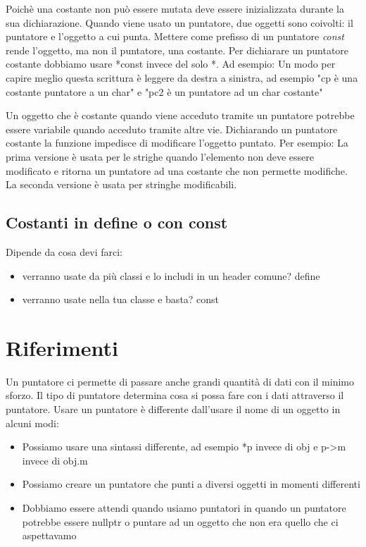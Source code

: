 \documentclass[11pt,a4paper]{book}
\begin{document}
Poichè una costante non può essere mutata deve essere inizializzata durante la sua dichiarazione.
\label{code: 094}
Quando viene usato un puntatore, due oggetti sono coivolti: il puntatore e l'oggetto a cui punta. Mettere come prefisso di un puntatore \emph{const} rende l'oggetto, ma non il puntatore, una costante. Per dichiarare un puntatore costante dobbiamo usare *const invece del solo *. Ad esempio:
\label{code: 093}
Un modo per capire meglio questa scrittura è leggere da destra a sinistra, ad esempio "cp è una costante puntatore a un char" e "pc2 è un puntatore ad un char costante"

Un oggetto che è costante quando viene acceduto tramite un puntatore potrebbe essere variabile quando acceduto tramite altre vie. Dichiarando un puntatore costante la funzione impedisce di modificare l'oggetto puntato. Per esempio:
\label{code: 095}
La prima versione è usata per le strighe quando l'elemento non deve essere modificato e ritorna un puntatore ad una costante che non permette modifiche. La seconda versione è usata per stringhe modificabili.

\subsection{Costanti in define o con const} \label{par: define e const}
Dipende da cosa devi farci:
\begin{itemize}
	\item verranno usate da più classi e lo includi in un header comune? define
	\item verranno usate nella tua classe e basta? const
\end{itemize}

\section{Riferimenti}
Un puntatore ci permette di passare anche grandi quantità di dati con il minimo sforzo. Il tipo di puntatore determina cosa si possa fare con i dati attraverso il puntatore. Usare un puntatore è differente dall'usare il nome di un oggetto in alcuni modi:
\begin{itemize}
	\item Possiamo usare una sintassi differente, ad esempio *p invece di obj e p->m invece di obj.m
	\item Possiamo creare un puntatore che punti a diversi oggetti in momenti differenti
	\item Dobbiamo essere attendi quando usiamo puntatori in quando un puntatore potrebbe essere nullptr o puntare ad un oggetto che non era quello che ci aspettavamo
\end{itemize}
\end{document}
